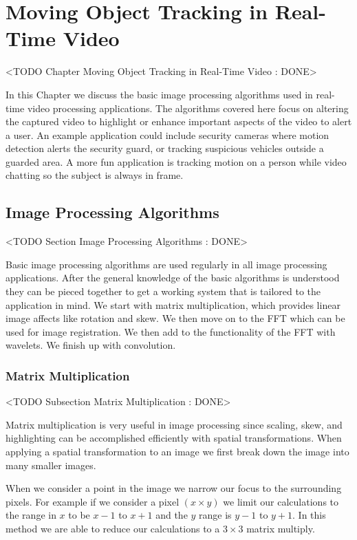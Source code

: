 \chapter{Moving Object Tracking in Real-Time Video}
	<TODO Chapter Moving Object Tracking in Real-Time Video : DONE>

In this Chapter we discuss the basic image processing algorithms used in real-time video processing applications. The algorithms covered here focus on altering the captured video to highlight or enhance important aspects of the video to alert a user. An example application could include security cameras where motion detection alerts the security guard, or tracking suspicious vehicles outside a guarded area. A more fun application is tracking motion on a person while video chatting so the subject is always in frame. 

	
\section{Image Processing Algorithms}
	<TODO Section Image Processing Algorithms : DONE>

Basic image processing algorithms are used regularly in all image processing applications. After the general knowledge of the basic algorithms is understood they can be pieced together to get a working system that is tailored to the application in mind. We start with matrix multiplication, which provides linear image affects like rotation and skew. We then move on to the \ac{FFT} which can be used for image registration. We then add to the functionality of the \ac{FFT} with wavelets. We finish up with convolution.
	
\subsection{Matrix Multiplication}
	<TODO Subsection Matrix Multiplication : DONE>

Matrix multiplication is very useful in image processing since scaling, skew, and highlighting can be accomplished efficiently with spatial transformations. When applying a spatial transformation to an image we first break down the image into many smaller images. 

When we consider a point in the image we narrow our focus to the surrounding pixels. For example if we consider a pixel $(x\times y)$ we limit our calculations to the range in $x$ to be $x-1$ to $x+1$ and the $y$ range is $y-1$ to $y+1$. In this method we are able to reduce our calculations to a $3 \times 3$ matrix multiply. 

